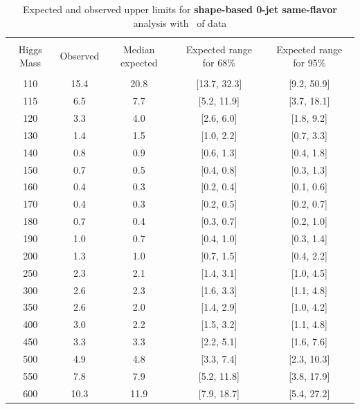 \begin{table}[!hbp]
\begin{center}
\begin{tabular}{c c c c c}
\hline
\vspace{-3mm} && \\
 Higgs Mass   & Observed & Median expected & Expected range for 68\% & Expected range for 95\%   \\
\vspace{-3mm} && \\
\hline
110 & 15.4 & 20.8 & [13.7, 32.3] & [9.2, 50.9] \\
115 & 6.5 & 7.7 & [5.2, 11.9] & [3.7, 18.1] \\
120 & 3.3 & 4.0 & [2.6, 6.0] & [1.8, 9.2] \\
130 & 1.4 & 1.5 & [1.0, 2.2] & [0.7, 3.3] \\
140 & 0.8 & 0.9 & [0.6, 1.3] & [0.4, 1.8] \\
150 & 0.7 & 0.5 & [0.4, 0.8] & [0.3, 1.3] \\
160 & 0.4 & 0.3 & [0.2, 0.4] & [0.1, 0.6] \\
170 & 0.4 & 0.3 & [0.2, 0.5] & [0.2, 0.7] \\
180 & 0.7 & 0.4 & [0.3, 0.7] & [0.2, 1.0] \\
190 & 1.0 & 0.7 & [0.4, 1.0] & [0.3, 1.4] \\
200 & 1.3 & 1.0 & [0.7, 1.5] & [0.4, 2.2] \\
250 & 2.3 & 2.1 & [1.4, 3.1] & [1.0, 4.5] \\
300 & 2.6 & 2.3 & [1.6, 3.3] & [1.1, 4.8] \\
350 & 2.6 & 2.0 & [1.4, 2.9] & [1.0, 4.2] \\
400 & 3.0 & 2.2 & [1.5, 3.2] & [1.1, 4.8] \\
450 & 3.3 & 3.3 & [2.2, 5.1] & [1.6, 7.6] \\
500 & 4.9 & 4.8 & [3.3, 7.4] & [2.3, 10.3] \\
550 & 7.8 & 7.9 & [5.2, 11.8] & [3.8, 17.9] \\
600 & 10.3 & 11.9 & [7.9, 18.7] & [5.4, 27.2] \\
\hline
\end{tabular}
\caption{Expected and observed upper limits for {\bf shape-based 0-jet
    same-flavor} analysis with \intlumi\ of data}
\label{tab:sf0_cut}
\end{center}
\end{table}

